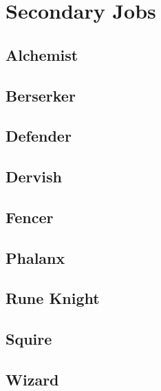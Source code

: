 \section{Secondary Jobs}\label{sec:jobs-sjob}
\subsection{Alchemist}\label{subsec:sjob-alchemist}

\subsection{Berserker}\label{subsec:sjob-berserker}

\subsection{Defender}\label{subsec:sjob-defender}

\subsection{Dervish}\label{subsec:sjob-dervish}

\subsection{Fencer}\label{subsec:sjob-fencer}

\subsection{Phalanx}\label{subsec:sjob-phalanx}

\subsection{Rune Knight}\label{subsec:sjob-runeknight}

\subsection{Squire}\label{subsec:sjob-squire}

\subsection{Wizard}\label{subsec:sjob-wizard}
